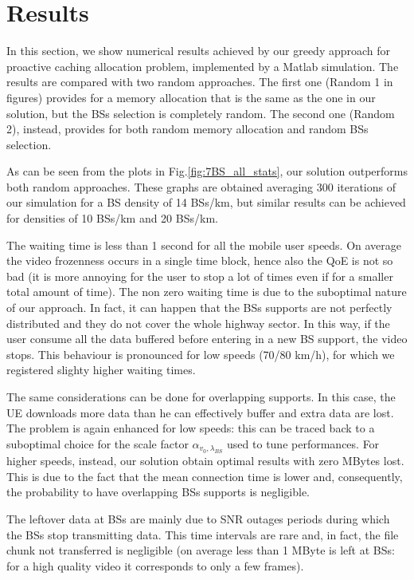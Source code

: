 \documentclass[conference,10pt]{IEEEtran}
\begin{document}
\section{Results}\label{sec:res}
In this section, we show numerical results achieved by our greedy approach for proactive caching allocation problem, implemented by a Matlab simulation. The results are compared with two random approaches. The first one (Random 1 in figures) provides for a memory allocation that is the same as the one in our solution, but the BSs selection is completely random. The second one (Random 2), instead, provides for both random memory allocation and random BSs selection.

As can be seen from the plots in Fig.\ref{fig:7BS_all_stats}, our solution outperforms both random approaches. These graphs are obtained averaging 300 iterations of our simulation for a BS density of 14 BSs/km, but similar results can be achieved for densities of 10 BSs/km and 20 BSs/km.

The waiting time is less than 1 second for all the mobile user speeds. On average the video frozenness occurs in a single time block, hence also the QoE is not so bad (it is more annoying for the user to stop a lot of times even if for a smaller total amount of time). The non zero waiting time is due to the suboptimal nature of our approach. In fact, it can happen that the BSs supports are not perfectly distributed and they do not cover the whole highway sector. In this way, if the user consume all the data buffered before entering in a new BS support, the video stops. This behaviour is pronounced for low speeds (70/80 km/h), for which we registered slighty higher waiting times.

The same considerations can be done for overlapping supports. In this case, the UE downloads more data than he can effectively buffer and extra data are lost. The problem is again enhanced for low speeds: this can be traced back to a suboptimal choice for the scale factor $\alpha_{v_0, \lambda_{B\!S}}$ used to tune performances. For higher speeds, instead, our solution obtain optimal results with zero MBytes lost. This is due to the fact that the mean connection time is lower and, consequently, the probability to have overlapping BSs supports is negligible.

The leftover data at BSs are mainly due to SNR outages periods during which the BSs stop transmitting data. This time intervals are rare and, in fact, the file chunk not transferred is negligible (on average less than 1 MByte is left at BSs: for a high quality video it corresponds to only a few frames).
\end{document}
